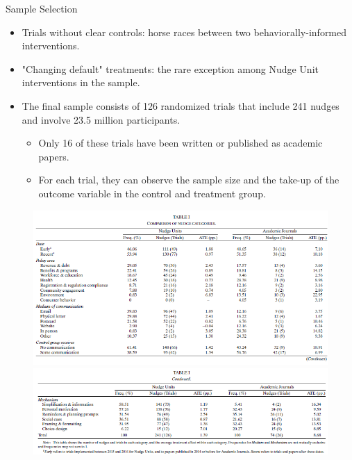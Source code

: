 \documentclass[dvipdfmx,11pt]{beamer}
\begin{document}
\begin{frame}{Sample Selection}
  \begin{itemize}
    \item Trials without clear controls: horse races between two behaviorally-informed interventions.
    \item "Changing default" treatments: the rare exception among Nudge Unit interventions in the sample.
    \item The final sample consists of 126 randomized trials that include 241 nudges and involve 23.5 million participants.
    \begin{itemize}
      \item Only 16 of these trials have been written or published as academic papers.
      \item For each trial, they can observe the sample size and the take-up of the outcome variable in the control and treatment group.
    \end{itemize}
  \end{itemize}
\end{frame}

\begin{frame}{}
  \begin{figure}
    \centering
    \includegraphics[scale = .5]{fig_tab/os20220412/T1}
    \includegraphics[scale = .5]{fig_tab/os20220412/T1b.png}
  \end{figure}
\end{frame}
\end{document}
